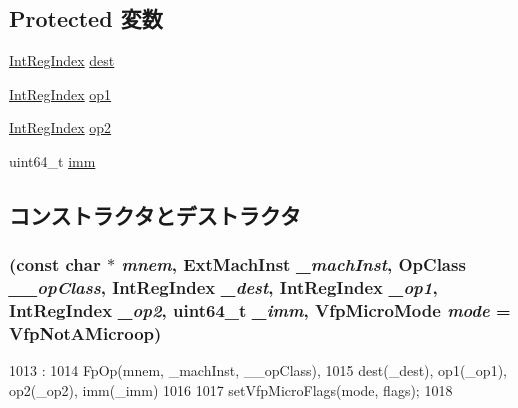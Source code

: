 \subsection*{Protected 変数}
\begin{DoxyCompactItemize}
\item 
\hyperlink{namespaceArmISA_ae64680ba9fb526106829d6bf92fc791b}{IntRegIndex} \hyperlink{classArmISA_1_1FpRegRegRegImmOp_aec72e8e45bdc87abeeeb75d2a8a9a716}{dest}
\item 
\hyperlink{namespaceArmISA_ae64680ba9fb526106829d6bf92fc791b}{IntRegIndex} \hyperlink{classArmISA_1_1FpRegRegRegImmOp_a4c465c43ad568f8bcf8ae71480e9cfea}{op1}
\item 
\hyperlink{namespaceArmISA_ae64680ba9fb526106829d6bf92fc791b}{IntRegIndex} \hyperlink{classArmISA_1_1FpRegRegRegImmOp_a7799ff6cbe5a252199059eb8665820e7}{op2}
\item 
uint64\_\-t \hyperlink{classArmISA_1_1FpRegRegRegImmOp_a2b4406ad2843b5aa12d244d01d8fdc69}{imm}
\end{DoxyCompactItemize}


\subsection{コンストラクタとデストラクタ}
\hypertarget{classArmISA_1_1FpRegRegRegImmOp_a742b4705a73315a904eeb1c010839fb8}{
\subsubsection[{FpRegRegRegImmOp}]{ (const char $\ast$ {\em mnem}, \/  {\bf ExtMachInst} {\em \_\-machInst}, \/  OpClass {\em \_\-\_\-opClass}, \/  {\bf IntRegIndex} {\em \_\-dest}, \/  {\bf IntRegIndex} {\em \_\-op1}, \/  {\bf IntRegIndex} {\em \_\-op2}, \/  uint64\_\-t {\em \_\-imm}, \/  {\bf VfpMicroMode} {\em mode} = {\ttfamily VfpNotAMicroop})}}
\label{classArmISA_1_1FpRegRegRegImmOp_a742b4705a73315a904eeb1c010839fb8}



\begin{DoxyCode}
1013                                                                         :
1014         FpOp(mnem, _machInst, __opClass),
1015         dest(_dest), op1(_op1), op2(_op2), imm(_imm)
1016     {
1017         setVfpMicroFlags(mode, flags);
1018     }

\end{DoxyCode}


